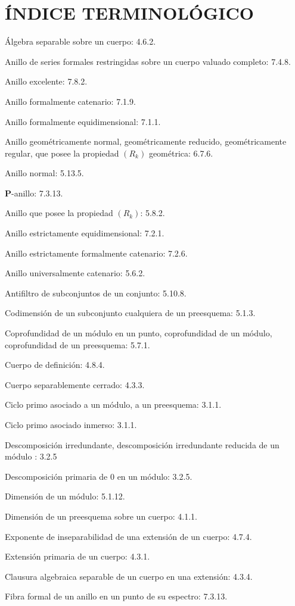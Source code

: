 \clearpage
{}
{}
\section*{ÍNDICE TERMINOLÓGICO}

\begingroup
\footnotesize
\setlength{\parindent}{0pt}
\setlength{\parskip}{1.1pt}
\newcommand{\EGAIVtwoTerm}[2]{#1: #2.\par}

\EGAIVtwoTerm{Álgebra separable sobre un cuerpo}{4.6.2}
\EGAIVtwoTerm{Anillo de series formales restringidas sobre un cuerpo valuado completo}{7.4.8}
\EGAIVtwoTerm{Anillo excelente}{7.8.2}
\EGAIVtwoTerm{Anillo formalmente catenario}{7.1.9}
\EGAIVtwoTerm{Anillo formalmente equidimensional}{7.1.1}
\EGAIVtwoTerm{Anillo geométricamente normal, geométricamente reducido,
geométricamente regular, que posee la propiedad $(R_k)$ geométrica}{6.7.6}
\EGAIVtwoTerm{Anillo normal}{5.13.5}
\EGAIVtwoTerm{$\boldsymbol P$-anillo}{7.3.13}
\EGAIVtwoTerm{Anillo que posee la propiedad $(R_k)$}{5.8.2}
\EGAIVtwoTerm{Anillo estrictamente equidimensional}{7.2.1}
\EGAIVtwoTerm{Anillo estrictamente formalmente catenario}{7.2.6}
\EGAIVtwoTerm{Anillo universalmente catenario}{5.6.2}
\EGAIVtwoTerm{Antifiltro de subconjuntos de un conjunto}{5.10.8}

\medskip
\EGAIVtwoTerm{Codimensión de un subconjunto cualquiera de un preesquema}{5.1.3}
\EGAIVtwoTerm{Coprofundidad de un módulo en un punto, coprofundidad de un módulo,
coprofundidad de un preesquema}{5.7.1}
\EGAIVtwoTerm{Cuerpo de definición}{4.8.4}
\EGAIVtwoTerm{Cuerpo separablemente cerrado}{4.3.3}
\EGAIVtwoTerm{Ciclo primo asociado a un módulo, a un preesquema}{3.1.1}
\EGAIVtwoTerm{Ciclo primo asociado inmerso}{3.1.1}

\medskip
Descomposición irredundante, descomposición irredundante reducida
de un módulo : 3.2.5\par
\EGAIVtwoTerm{Descomposición primaria de $0$ en un módulo}{3.2.5}
\EGAIVtwoTerm{Dimensión de un módulo}{5.1.12}
\EGAIVtwoTerm{Dimensión de un preesquema sobre un cuerpo}{4.1.1}

\medskip
\EGAIVtwoTerm{Exponente de inseparabilidad de una extensión de un cuerpo}{4.7.4}
\EGAIVtwoTerm{Extensión primaria de un cuerpo}{4.3.1}

\medskip
\EGAIVtwoTerm{Clausura algebraica separable de un cuerpo en una extensión}{4.3.4}
\EGAIVtwoTerm{Fibra formal de un anillo en un punto de su espectro}{7.3.13}

